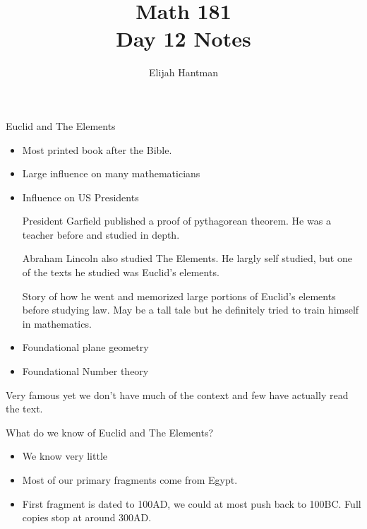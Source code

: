 \documentclass{report}
\title{\Huge{Math 181}\\Day 12 Notes}
\author{\huge{Elijah Hantman}}
\date{}
\begin{document}
\maketitle
\newpage

\begin{description}
    \item {\large Euclid and The Elements}    
        \begin{mdframed}
            \begin{itemize}
                \item Most printed book after the Bible.
                \item Large influence on many mathematicians
                \item Influence on US Presidents
                    \begin{mdframed}
                        President Garfield published a proof
                        of pythagorean theorem. He was a teacher
                        before and studied in depth.
                    \end{mdframed}
                    \begin{mdframed}
                        Abraham Lincoln also studied The Elements.
                        He largly self studied, but one of the
                        texts he studied was Euclid's elements.
                        
                        Story of how he went and memorized large
                        portions of Euclid's elements before studying
                        law. May be a tall tale but he definitely 
                        tried to train himself in mathematics.
                    \end{mdframed}
                \item Foundational plane geometry
                \item Foundational Number theory
            \end{itemize}
                
            Very famous yet we don't have much of the context
            and few have actually read the text.
        \end{mdframed}
    \item {\large What do we know of Euclid and The Elements?}
        \begin{mdframed}
            \begin{itemize}
                \item We know very little
                \item Most of our primary fragments come from
                    Egypt. 
                \item First fragment is dated to 100AD, we could
                    at most push back to 100BC. Full copies stop
                    at around 300AD.
            \end{itemize}


\end{mdframed}
\end{description}
\end{document}
